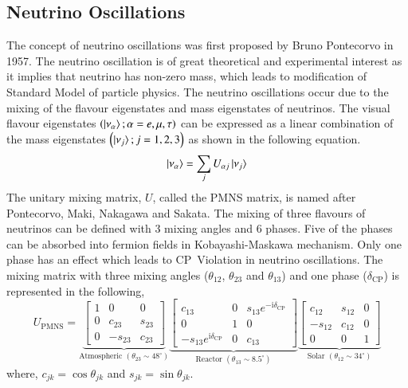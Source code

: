 \subsection{Neutrino Oscillations}
The concept of neutrino oscillations was first proposed by Bruno
Pontecorvo in 1957\cite{pontecorvo1,pontecorvo2}. The neutrino
oscillation is of great theoretical and experimental interest as it
implies that neutrino has non-zero mass, which leads to modification
of Standard Model of particle physics. The neutrino oscillations occur due to the mixing of the flavour eigenstates and mass eigenstates of
neutrinos. The visual flavour eigenstates
$\left(\ket{\nu_{\alpha}};\alpha=e,\mu,\tau\right)$ can be expressed as
a linear combination of the mass eigenstates
$\left(\ket{\nu_{j}};j=1,2,3\right)$ as shown in the following equation.
\begin{equation}
  \ket{\nu_{\alpha}}=\sum_{j}U_{\alpha j}\ket{\nu_{j}} \label{eq:tzero}
\end{equation}
The unitary mixing matrix, $U$, called the PMNS matrix, is named after
Pontecorvo, Maki, Nakagawa and Sakata. The mixing of three flavours of
neutrinos can be defined with 3 mixing angles and 6 phases. Five of
the phases can be absorbed into fermion fields in Kobayashi-Maskawa
mechanism\cite{kobayashimaskawa}. Only one phase has an effect which
leads to CP~Violation in neutrino oscillations. The mixing matrix with
three mixing angles ($\theta_{12}$, $\theta_{23}$ and $\theta_{13}$) and
one phase ($\delta_{\mathrm{CP}}$) is represented in the following,
\begin{equation}
  U_{\mathrm{PMNS}} =
  \underbrace{\begin{bmatrix}
      1 & 0 & 0 \\
      0 & c_{23} & s_{23} \\
      0 & -s_{23} & c_{23}
    \end{bmatrix}
  }_{\text{Atmospheric }\left(\theta_{23}\sim 48^{\circ}\right)}
  \underbrace{\begin{bmatrix}
      c_{13} & 0 & s_{13}e^{-\mathrm{i}\delta_{\mathrm{CP}}} \\
      0 & 1 & 0 \\
      -s_{13}e^{\mathrm{i}\delta_{\mathrm{CP}}} & 0 & c_{13}
    \end{bmatrix}
  }_{\text{Reactor }\left(\theta_{13}\sim 8.5^{\circ}\right)}
  \underbrace{\begin{bmatrix}
      c_{12} & s_{12} & 0 \\
      -s_{12} & c_{12} & 0 \\
      0 & 0 & 1
    \end{bmatrix}
  }_{\text{Solar }\left(\theta_{12}\sim 34^{\circ}\right)}
   \label{eq:pmns}
\end{equation}
where, $c_{jk}=\cos\theta_{jk}$ and $s_{jk}=\sin\theta_{jk}$.

